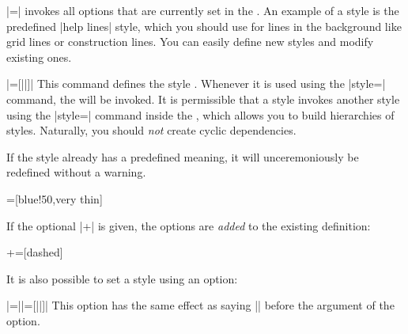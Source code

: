 \begin{itemize}
  |=|
  invokes all options that are currently set in the . An example of a style is the predefined |help lines| style,
  which you should use for lines in the background like grid lines or
  construction lines. You can easily define new styles and modify
  existing ones.
\begin{codeexample}[]
\end{codeexample}
\end{itemize}


\begin{command}{\tikzstyle{}\opt{|+|}|=[||]|}
  This command defines the style . Whenever it is
  used using the |style=| command, the 
  will be invoked. It is permissible that a style invokes another
  style using the |style=| command inside the , which
  allows you to build hierarchies of styles. Naturally, you should
  \emph{not} create cyclic dependencies.

  If the style already has a predefined meaning, it will
  unceremoniously be redefined without a warning.
\begin{codeexample}[]
=[blue!50,very thin]
\end{codeexample}

  If the optional |+| is given, the options are \emph{added} to the
  existing definition:
\begin{codeexample}[]
+=[dashed]%
\end{codeexample}
\end{command}

It is also possible to set a style using an option:
\begin{itemize}
  |={|\opt{|+|}|=[||]}|
  This option has the same effect as saying |\tikzstyle| before the
  argument of the option. 
\begin{codeexample}[]
\end{codeexample}
\end{itemize}


